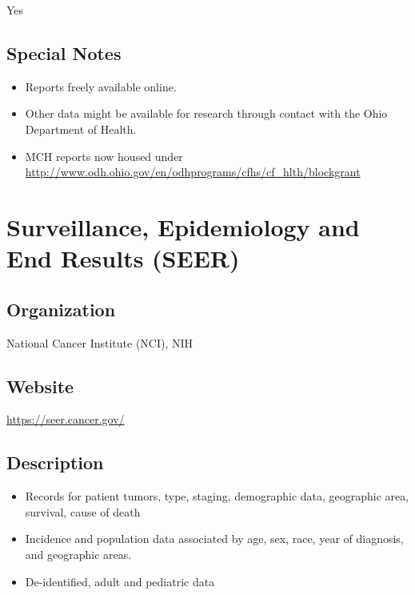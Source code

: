 \documentclass[
]{book}
\providecommand{\tightlist}{%
  \setlength{\itemsep}{0pt}\setlength{\parskip}{0pt}}
\begin{document}
Yes

\hypertarget{special-notes-85}{%
\section{Special Notes}\label{special-notes-85}}

\begin{itemize}
\tightlist
\item
  Reports freely available online.
\item
  Other data might be available for research through contact with the Ohio Department of Health.
\item
  MCH reports now housed under \url{http://www.odh.ohio.gov/en/odhprograms/cfhs/cf_hlth/blockgrant}
\end{itemize}

\mainmatter

\hypertarget{surveillance-epidemiology-and-end-results-seer}{%
\chapter{Surveillance, Epidemiology and End Results (SEER)}\label{surveillance-epidemiology-and-end-results-seer}}

\hypertarget{organization-86}{%
\section{Organization}\label{organization-86}}

National Cancer Institute (NCI), NIH

\hypertarget{website-86}{%
\section{Website}\label{website-86}}

\url{https://seer.cancer.gov/}

\hypertarget{description-86}{%
\section{Description}\label{description-86}}

\begin{itemize}
\tightlist
\item
  Records for patient tumors, type, staging, demographic data, geographic area, survival, cause of death
\item
  Incidence and population data associated by age, sex, race, year of diagnosis, and geographic areas.
\item
  De-identified, adult and pediatric data
\end{itemize}
\end{document}
